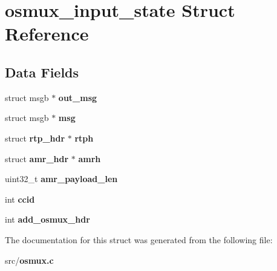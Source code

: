 \section{osmux\+\_\+input\+\_\+state Struct Reference}
\label{structosmux__input__state}
\subsection*{Data Fields}
\begin{DoxyCompactItemize}
\item 
struct msgb $\ast$ {\bfseries out\+\_\+msg}\label{structosmux__input__state_a63f3aa8f0abf13635f5825aca005e824}

\item 
struct msgb $\ast$ {\bfseries msg}\label{structosmux__input__state_a680977f2f95a27089b55f318c485bc9f}

\item 
struct {\bf rtp\+\_\+hdr} $\ast$ {\bfseries rtph}\label{structosmux__input__state_a07c397296785e0c29535bc2d2bc7db7a}

\item 
struct {\bf amr\+\_\+hdr} $\ast$ {\bfseries amrh}\label{structosmux__input__state_af314656bec412f19390db5bb9bdc8bbb}

\item 
uint32\+\_\+t {\bfseries amr\+\_\+payload\+\_\+len}\label{structosmux__input__state_a89e7e22ff611f563081ae3a7f7ad7e2c}

\item 
int {\bfseries ccid}\label{structosmux__input__state_a64b1a679d9e0c89438bae60d970477de}

\item 
int {\bfseries add\+\_\+osmux\+\_\+hdr}\label{structosmux__input__state_ae5283bdb09cdf2f9b7d42e85a4fb0ad5}

\end{DoxyCompactItemize}


The documentation for this struct was generated from the following file\+:\begin{DoxyCompactItemize}
\item 
src/{\bf osmux.\+c}\end{DoxyCompactItemize}
